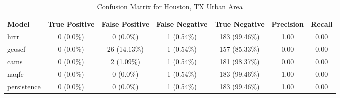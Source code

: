 \begin{table}[h!]
\centering
\begin{tabular}{lcccccc}
\hline
Model & True Positive & False Positive & False Negative & True Negative & Precision & Recall\\ \hline
hrrr & 0 (0.0\%) & 0 (0.0\%) & 1 (0.54\%) & 183 (99.46\%) & \cellcolor{green!25}1.00 & \cellcolor{green!25}0.00 \\ 
geoscf & 0 (0.0\%) & 26 (14.13\%) & 1 (0.54\%) & 157 (85.33\%) & \cellcolor{red!25}0.00 & \cellcolor{green!25}0.00 \\ 
cams & 0 (0.0\%) & 2 (1.09\%) & 1 (0.54\%) & 181 (98.37\%) & \cellcolor{red!25}0.00 & \cellcolor{green!25}0.00 \\ 
naqfc & 0 (0.0\%) & 0 (0.0\%) & 1 (0.54\%) & 183 (99.46\%) & \cellcolor{green!25}1.00 & \cellcolor{green!25}0.00 \\ 
persistence & 0 (0.0\%) & 0 (0.0\%) & 1 (0.54\%) & 183 (99.46\%) & 1.00 & 0.00 \\ 
\hline
\end{tabular}
\caption{Confusion Matrix for Houston, TX Urban Area}
\end{table}

